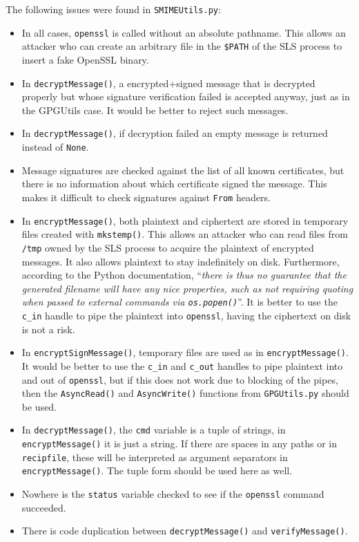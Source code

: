 \documentclass[a4]{article}
\newcommand{\iquote}[1]{``\textit{#1}''}
\newcommand{\file}[1]{\texttt{#1}}
\newcommand{\var}[1]{\texttt{#1}}
\newcommand{\val}[1]{\texttt{#1}}
\newcommand{\func}[1]{\texttt{#1()}}
\newcommand{\hdr}[1]{\texttt{#1}}
\newcommand{\cmd}[1]{\texttt{#1}}
\newcommand{\env}[1]{\texttt{\$#1}}
\begin{document}
The following issues were found in \file{SMIMEUtils.py}:

\begin{itemize}
\item In all cases, \file{openssl} is called without an absolute pathname.
This allows an attacker who can create an arbitrary file in the \env{PATH} of the SLS process to insert a fake OpenSSL binary.
\item In \func{decryptMessage},
a encrypted+signed message that is decrypted properly but whose signature verification failed is accepted anyway,
just as in the GPGUtils case. It would be better to reject such messages.
\item In \func{decryptMessage}, if decryption failed an empty message is returned instead of \val{None}.
\item Message signatures are checked against the list of all known certificates,
but there is no information about which certificate signed the message.
This makes it difficult to check signatures against \hdr{From} headers.
\item In \func{encryptMessage}, both plaintext and ciphertext are stored in temporary files created with \func{mkstemp}.
This allows an attacker who can read files from \file{/tmp} owned by the SLS process
to acquire the plaintext of encrypted messages.
It also allows plaintext to stay indefinitely on disk.
Furthermore, according to the Python documentation,
\iquote{there is thus no guarantee that the generated filename will have any nice properties,
such as not requiring quoting when passed to external commands via \func{os.popen}}.
It is better to use the \var{c\_in} handle to pipe the plaintext into \cmd{openssl},
having the ciphertext on disk is not a risk.
\item In \func{encryptSignMessage}, temporary files are used as in \func{encryptMessage}.
It would be better to use the \var{c\_in} and \var{c\_out} handles to pipe plaintext into and out of \cmd{openssl},
but if this does not work due to blocking of the pipes,
then the \func{AsyncRead} and \func{AsyncWrite} functions from \file{GPGUtils.py} should be used.
\item In \func{decryptMessage}, the \var{cmd} variable is a tuple of strings, in \func{encryptMessage} it is just a string.
If there are spaces in any paths or in \var{recipfile},
these will be interpreted as argument separators in \func{encryptMessage}.
The tuple form should be used here as well.
\item Nowhere is the \var{status} variable checked to see if the \cmd{openssl} command succeeded.
\item There is code duplication between \func{decryptMessage} and \func{verifyMessage}.
\end{itemize}
\end{document}
